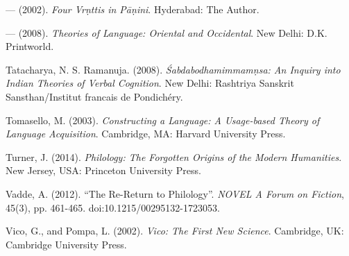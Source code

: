 \begin{thebibliography}{99}
  — (2002). \textit{Four Vrṇttis in Pāṇini}. Hyderabad: The Author.

  — (2008). \textit{Theories of Language: Oriental and Occidental}. New Delhi: D.K. Printworld.

  Tatacharya, N. S. Ramanuja. (2008). \textit{Śabdabodhamimmamṇsa: An Inquiry into Indian Theories of Verbal Cognition}. New Delhi: Rashtriya Sanskrit Sansthan/Institut francais de Pondichéry.

  Tomasello, M. (2003). \textit{Constructing a Language: A Usage-based Theory of Language Acquisition}. Cambridge, MA: Harvard University Press.

  Turner, J. (2014). \textit{Philology: The Forgotten Origins of the Modern Humanities}. New Jersey, USA: Princeton University Press.

  Vadde, A. (2012). “The Re-Return to Philology”. \textit{NOVEL A Forum on Fiction}, 45(3), pp. 461-465. doi:10.1215/00295132-1723053.

  Vico, G., and Pompa, L. (2002). \textit{Vico: The First New Science}. Cambridge, UK: Cambridge University Press.

 \end{thebibliography}

\theendnotes

